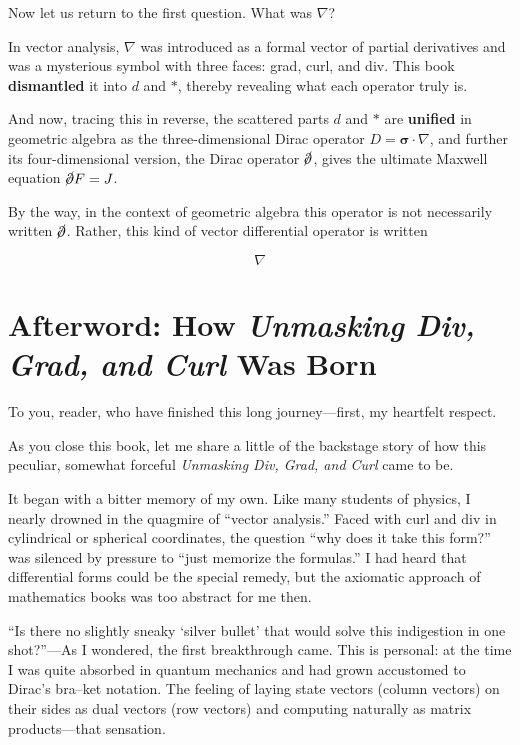 \documentclass[a4paper,12pt,openany]{book}
\begin{document}
Now let us return to the first question. What was \(\nabla\)?

In vector analysis, \(\nabla\) was introduced as a formal vector of
partial derivatives and was a mysterious symbol with three faces: grad,
curl, and div. This book \textbf{dismantled} it into \(d\) and \(\ast\),
thereby revealing what each operator truly is.

And now, tracing this in reverse, the scattered parts \(d\) and \(\ast\)
are \textbf{unified} in geometric algebra as the three-dimensional Dirac
operator \(D = \bm{\sigma}\!\cdot\!\nabla\), and further its
four-dimensional version, the Dirac operator \(\cancel{\partial}\),
gives the ultimate Maxwell equation \(\cancel{\partial} F = J\).

By the way, in the context of geometric algebra this operator is not
necessarily written \(\cancel{\partial}\). Rather, this kind of vector
differential operator is written

\[
\nabla
\]

\newpage


\backmatter
\hypertarget{afterword-how-unmasking-div-grad-and-curl-was-born}{%
\chapter{\texorpdfstring{Afterword: How \emph{Unmasking Div, Grad, and
Curl} Was
Born}{Afterword: How Unmasking Div, Grad, and Curl Was Born}}\label{afterword-how-unmasking-div-grad-and-curl-was-born}}

To you, reader, who have finished this long journey—first, my
heartfelt respect.

As you close this book, let me share a little of the backstage story of
how this peculiar, somewhat forceful \emph{Unmasking Div, Grad, and
Curl} came to be.

It began with a bitter memory of my own. Like many students of physics,
I nearly drowned in the quagmire of ``vector analysis.'' Faced with
\(\mathrm{curl}\) and \(\mathrm{div}\) in cylindrical or spherical
coordinates, the question ``why does it take this form?'' was silenced
by pressure to ``just memorize the formulas.'' I had heard that
differential forms could be the special remedy, but the axiomatic
approach of mathematics books was too abstract for me then.

``Is there no slightly sneaky `silver bullet' that would solve this
indigestion in one shot?''—As I wondered, the first breakthrough came.
This is personal: at the time I was quite absorbed in quantum mechanics
and had grown accustomed to Dirac's bra–ket notation. The feeling of
laying state vectors (column vectors) on their sides as dual vectors
(row vectors) and computing naturally as matrix products—that
sensation.
\end{document}
